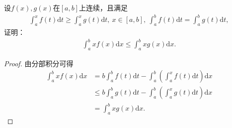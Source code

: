 \documentclass[../../main.tex]{subfiles}%
\begin{document}
\begin{example}
设$f(x),g(x)$在$[a,b]$上连续，且满足
\begin{align*}
\int_a^x f(t)\mathrm{d}t \geqslant \int_a^x g(t)\mathrm{d}t, \ x\in[a,b], \ \int_a^b f(t)\mathrm{d}t = \int_a^b g(t)\mathrm{d}t,
\end{align*}
证明：
\begin{align*}
\int_a^b xf(x)\mathrm{d}x \leqslant \int_a^b xg(x)\mathrm{d}x.
\end{align*}
\end{example}
\begin{proof}
由分部积分可得
\begin{align*}
\int_a^b{xf\left( x \right) \mathrm{d}x}&=b\int_a^b{f\left( t \right) \mathrm{d}t}-\int_a^b{\left( \int_a^x{f\left( t \right) \mathrm{d}t} \right) \mathrm{d}x}
\\
&\leqslant b\int_a^b{g\left( t \right) \mathrm{d}t}-\int_a^b{\left( \int_a^x{g\left( t \right) \mathrm{d}t} \right) \mathrm{d}x}
\\
&=\int_a^b{xg\left( x \right) \mathrm{d}x}.
\end{align*}
\end{proof}
\end{document}
